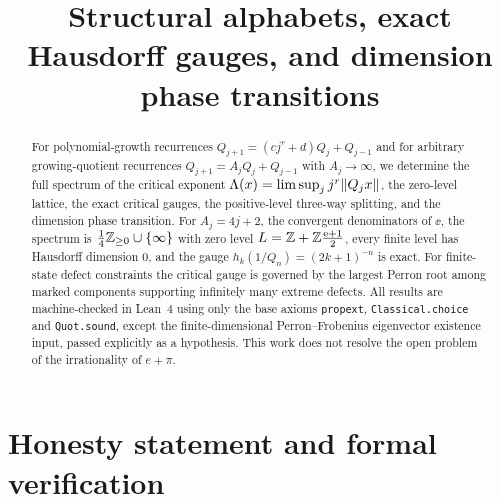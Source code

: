 \title{Structural alphabets, exact Hausdorff gauges, and dimension phase transitions}


\maketitle

\begin{abstract}
For polynomial-growth recurrences $Q_{j+1}=(cj^r+d)Q_j+Q_{j-1}$ and for
arbitrary growing-quotient recurrences $Q_{j+1}=A_jQ_j+Q_{j-1}$ with
$A_j\to\infty$, we determine the full spectrum of the critical exponent
$\Lambda(x)=\limsup_j j^r\|Q_jx\|$, the zero-level lattice, the exact critical
gauges, the positive-level three-way splitting, and the dimension phase
transition. For $A_j=4j+2$, the convergent denominators of $\ee$, the spectrum
is $\frac14\mathbb{Z}_{\ge0}\cup\{\infty\}$ with zero level $L=\mathbb{Z}+\mathbb{Z}\frac{\mathrm{e}+1}{2}$,
every finite level has Hausdorff dimension $0$, and the gauge
$h_k(1/Q_n)=(2k+1)^{-n}$ is exact. For finite-state defect constraints the
critical gauge is governed by the largest Perron root among marked components
supporting infinitely many extreme defects. All results are machine-checked in
Lean~4 using only the base axioms \texttt{propext}, \texttt{Classical.choice}
and \texttt{Quot.sound}, except the finite-dimensional Perron--Frobenius
eigenvector existence input, passed explicitly as a hypothesis. This work does
not resolve the open problem of the irrationality of $e+\pi$.
\end{abstract}

\section*{Honesty statement and formal verification}

